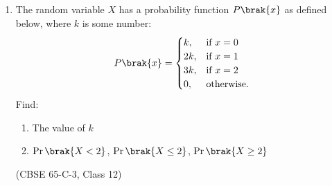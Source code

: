 \begin{enumerate}[label=\thesubsection.\arabic*., ref=\thesubsection.\theenumi]
\solution The equation can be expressed as
\begin{align}
xy'-y = x
\end{align}
Let $Y\brak{s}=\mathcal{L}\cbrak{y}$. From \eqref{eq:c12-lap-der}, $\mathcal{L}\cbrak{xy'}=-\brak{Y+sY'}$, and from \eqref{eq:c12-lap-tab}, $\mathcal{L}\cbrak{x}=\frac{1}{s^2}$. Taking the Laplace transform,
\begin{align}
-Y-sY'-Y = \frac{1}{s^2}
\implies Y'+\frac{2}{s}Y = -\frac{1}{s^3}
\end{align}
The integrating factor is $e^{\int\frac{2}{s}ds}=s^2$, so
\begin{align}
\brak{s^2Y}' = -\frac{1}{s}
\implies s^2Y = -\ln s + C
\implies Y = \frac{C-\ln s}{s^2}
\end{align}
From \eqref{eq:c12-lap-der} and \eqref{eq:c12-lap-ln},
\begin{align}
\mathcal{L}\cbrak{x\ln x} = -\frac{d}{ds}\brak{-\frac{\gamma+\ln s}{s}} = \frac{1-\gamma-\ln s}{s^2}
\end{align}
\begin{align}
\implies -\frac{\ln s}{s^2} = \mathcal{L}\cbrak{x\ln x}-\frac{1-\gamma}{s^2}
\end{align}
Taking the inverse transform using \eqref{eq:c12-lap-tab},
\begin{align}
y = x\ln x + \brak{C-1+\gamma}x = x\brak{\ln x + C_1}
\end{align}
where $C_1$ is a constant. Substituting back, $xy' = x\ln x+x+C_1x = x+y$.
 
The code integrates the equation using \eqref{eq:c12-euler} for several values of $C_1$ and compares with $x\brak{\ln x+C_1}$.
 
\begin{center}
\end{center}
 
\setcounter{enumi}{27}
\item The random variable $X$ has a probability function $P\brak{x}$ as defined below, where $k$ is some number:
\begin{align*}
P\brak{x} = \begin{cases}
k, & \text{if } x=0\\
2k, & \text{if } x=1\\
3k, & \text{if } x=2\\
0, & \text{otherwise.}
\end{cases}
\end{align*}
Find:
\begin{enumerate}[label=(\roman*)]
\item The value of $k$
\item $\Pr\brak{X<2}$, $\Pr\brak{X\le 2}$, $\Pr\brak{X\ge 2}$
\end{enumerate}
\hfill (CBSE 65-C-3, Class 12)
 

\end{enumerate}
